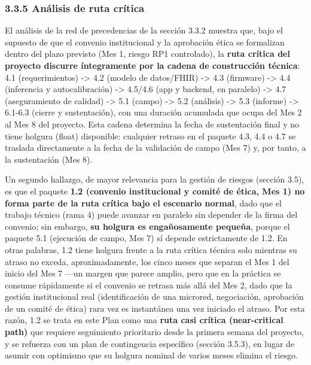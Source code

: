 \documentclass[11pt,a4paper]{article}
\begin{document}
\subsubsection{3.3.5 Análisis de ruta crítica}\label{anuxe1lisis-de-ruta-cruxedtica}

El análisis de la red de precedencias de la sección 3.3.2 muestra que, bajo el supuesto de que el convenio institucional y la aprobación ética se formalizan dentro del plazo previsto (Mes 1, riesgo RP1 controlado), la \textbf{ruta crítica del proyecto discurre íntegramente por la cadena de construcción técnica}: 4.1 (requerimientos) -\textgreater{} 4.2 (modelo de datos/FHIR) -\textgreater{} 4.3 (firmware) -\textgreater{} 4.4 (inferencia y autocalibración) -\textgreater{} 4.5/4.6 (app y backend, en paralelo) -\textgreater{} 4.7 (aseguramiento de calidad) -\textgreater{} 5.1 (campo) -\textgreater{} 5.2 (análisis) -\textgreater{} 5.3 (informe) -\textgreater{} 6.1-6.3 (cierre y sustentación), con una duración acumulada que ocupa del Mes 2 al Mes 8 del proyecto. Esta cadena determina la fecha de sustentación final y no tiene holgura (float) disponible: cualquier retraso en el paquete 4.3, 4.4 o 4.7 se traslada directamente a la fecha de la validación de campo (Mes 7) y, por tanto, a la sustentación (Mes 8).

Un segundo hallazgo, de mayor relevancia para la gestión de riesgos (sección 3.5), es que el paquete \textbf{1.2 (convenio institucional y comité de ética, Mes 1) no forma parte de la ruta crítica bajo el escenario normal}, dado que el trabajo técnico (rama 4) puede avanzar en paralelo sin depender de la firma del convenio; sin embargo, \textbf{su holgura es engañosamente pequeña}, porque el paquete 5.1 (ejecución de campo, Mes 7) sí depende estrictamente de 1.2. En otras palabras, 1.2 tiene holgura frente a la ruta crítica técnica solo mientras su atraso no exceda, aproximadamente, los cinco meses que separan el Mes 1 del inicio del Mes 7 ---un margen que parece amplio, pero que en la práctica se consume rápidamente si el convenio se retrasa más allá del Mes 2, dado que la gestión institucional real (identificación de una microred, negociación, aprobación de un comité de ética) rara vez es instantánea una vez iniciado el atraso. Por esta razón, 1.2 se trata en este Plan como una \textbf{ruta casi crítica (near-critical path)} que requiere seguimiento prioritario desde la primera semana del proyecto, y se refuerza con un plan de contingencia específico (sección 3.5.3), en lugar de asumir con optimismo que su holgura nominal de varios meses elimina el riesgo.
\end{document}
